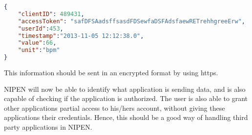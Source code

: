 \begin{lstlisting}[language=json]
{
	"clientID": 489431,
	"accessToken": "safDFSAadsffsasdFDSewfaDSFAdsfaewRETrehhgreeErw",
	"userId":453,
	"timestamp":"2013-11-05 12:12:38.0",
	"value":66,
	"unit":"bpm"
}
\end{lstlisting}

This information should be sent in an encrypted format by using https.

NIPEN will now be able to identify what application is sending data, and is also capable of checking if the application is authorized.
The user is also able to grant other applications partial access to his/hers account, without giving these applications their credentials.
Hence, this should be a good way of handling third party applications in NIPEN.
